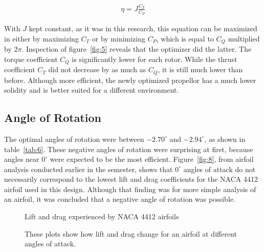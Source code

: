 \documentclass[journal ]{new-aiaa}
\begin{document}
\begin{equation}
	\begin{aligned}
	\label{equation:7}
	\eta = J \frac{C_{T}}{C_{P}}
	\end{aligned}
\end{equation}

With $J$ kept constant, as it was in this research, this equation can be maximized in either by maximizing $C_{T}$ or by minimizing $C_{P}$, which is equal to $C_{Q}$ multiplied by $2 \pi$. Inspection of figure~\eqref{fig:5} reveals that the optimizer did the latter. The torque coefficient $C_{Q}$ is significantly lower for each rotor. While the thrust coefficient $C_{T}$ did not decrease by as much as $C_{Q}$, it is still much lower than before. Although more efficient, the newly optimized propellor has a much lower solidity and is better suited for a different environment.

\subsection{Angle of Rotation}

The optimal angles of rotation were between $-2.70^{\circ}$ and $-2.94^{\circ}$, as shown in table~\eqref{tab:6}. These negative angles of rotation were surprising at first, because angles near $0^{\circ}$ were expected to be the most efficient. Figure~\eqref{fig:8}, from airfoil analysis conducted earlier in the semester, shows that $0^{\circ}$ angles of attack do not necessarily correspond to the lowest lift and drag coefficients for the NACA 4412 airfoil used in this design. Although that finding was for more simple analysis of an airfoil, it was concluded that a negative angle of rotation was possible.

\begin{figure}[H]
\centering
	\caption{Lift and drag experienced by NACA 4412 airfoils}
	\captionsetup{aboveskip=0pt,font=it}
	\caption*{These plots show how lift and drag change for an airfoil at different angles of attack.}
	\label{fig:8}
\end{figure}
\end{document}
